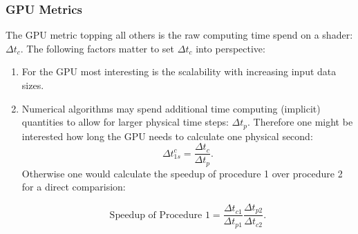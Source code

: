 \documentclass[m,times]{cgMA}
\begin{document}
\subsubsection{GPU Metrics}
The GPU metric topping all others is the raw computing time spend on a shader: $\Delta t_c$. The following factors matter to set $\Delta t_c$ into perspective:
\begin{enumerate}
  \item For the GPU most interesting is the scalability with increasing input data sizes.
  \item \label{it:speedup}Numerical algorithms may spend additional time computing (implicit) quantities to allow for larger physical time steps: $\Delta t_p$. Therefore one might be interested how long the GPU needs to calculate one physical second:
    \begin{equation}
    \Delta t^c_{1s} = \frac{\Delta t_c}{\Delta t_p}.
    \end{equation}
    Otherwise one would calculate the speedup of procedure 1 over procedure 2 for a direct comparision:

    \begin{equation}
      \text{Speedup of Procedure 1} = \frac{\Delta t_{c1}}{\Delta t_{p1}} \frac{\Delta t_{p2}}{\Delta t_{c2}}.
    \end{equation}
\end{enumerate}
\end{document}
